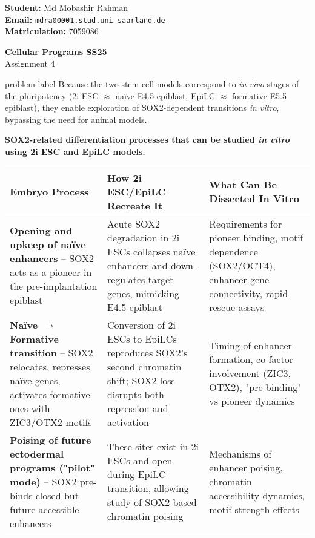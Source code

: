 




\noindent
\begin{minipage}[t]{0.55\textwidth}
    \textsf{\textbf{Student:}} Md Mobashir Rahman \\
    \textbf{Email:} \href{mailto:mdra00001.stud.uni-saarland.de}{\texttt{mdra00001.stud.uni-saarland.de}} \\
    \textsf{\textbf{Matriculation:}} 7059086
\end{minipage}
\hfill
\begin{minipage}[t]{0.4\textwidth}
    \raggedleft
    \begin{Large}
        \textsf{\textbf{Cellular Programs SS25}}\\
        Assignment 4
    \end{Large}
\end{minipage}

\vspace{1ex}

\begin{problem}{}{problem-label}
    Because the two stem-cell models correspond to \textit{in-vivo} stages of the pluripotency (2i ESC $\approx$ naïve E4.5 epiblast, EpiLC $\approx$ formative E5.5 epiblast), they enable exploration of SOX2-dependent transitions \textit{in vitro}, bypassing the need for animal models.

    \noindent\textbf{SOX2-related differentiation processes that can be studied \textit{in vitro} using 2i ESC and EpiLC models.}
    
    \noindent
    \begin{tabularx}{\textwidth}{|X|X|X|}
    \hline
    \textbf{Embryo Process} & \textbf{How 2i ESC/EpiLC Recreate It} & \textbf{What Can Be Dissected In Vitro} \\
    \hline
    \textbf{Opening and upkeep of naïve enhancers} – SOX2 acts as a pioneer in the pre-implantation epiblast & Acute SOX2 degradation in 2i ESCs collapses naïve enhancers and down-regulates target genes, mimicking E4.5 epiblast & Requirements for pioneer binding, motif dependence (SOX2/OCT4), enhancer-gene connectivity, rapid rescue assays \\
    \hline
    \textbf{Naïve $\rightarrow$ Formative transition} – SOX2 relocates, represses naïve genes, activates formative ones with ZIC3/OTX2 motifs & Conversion of 2i ESCs to EpiLCs reproduces SOX2's second chromatin shift; SOX2 loss disrupts both repression and activation & Timing of enhancer formation, co-factor involvement (ZIC3, OTX2), "pre-binding" vs pioneer dynamics \\
    \hline
    \textbf{Poising of future ectodermal programs ("pilot" mode)} – SOX2 pre-binds closed but future-accessible enhancers & These sites exist in 2i ESCs and open during EpiLC transition, allowing study of SOX2-based chromatin poising & Mechanisms of enhancer poising, chromatin accessibility dynamics, motif strength effects \\
    \hline
    \end{tabularx}
    
    
\end{problem}

